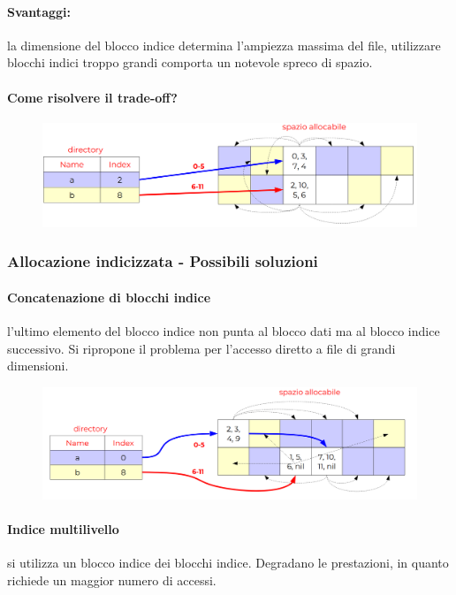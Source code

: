 \paragraph{Svantaggi:} la dimensione del blocco indice determina l’ampiezza massima del file, utilizzare blocchi indici troppo grandi comporta un notevole spreco di spazio.

\paragraph{Come risolvere il trade-off?}

\begin{figure} [h]
    \centering
    \includegraphics[width=0.7\linewidth]{Images/Screenshot 2025-01-18 at 16-40-54 so-07-filesystem.pdf.png}
\end{figure}



\subsubsection{Allocazione indicizzata - Possibili soluzioni}
\paragraph{Concatenazione di blocchi indice}
l’ultimo elemento del blocco indice non punta al blocco dati ma al
blocco indice successivo.
Si ripropone il problema per l’accesso diretto a file di grandi
dimensioni.
\begin{figure} [h]
    \centering
    \includegraphics[width=0.7\linewidth]{Images/Screenshot 2025-01-18 at 16-47-32 so-07-filesystem.pdf.png}
\end{figure}

\paragraph{Indice multilivello}
si utilizza un blocco indice dei blocchi indice.
Degradano le prestazioni, in quanto richiede un maggior numero di
accessi.

